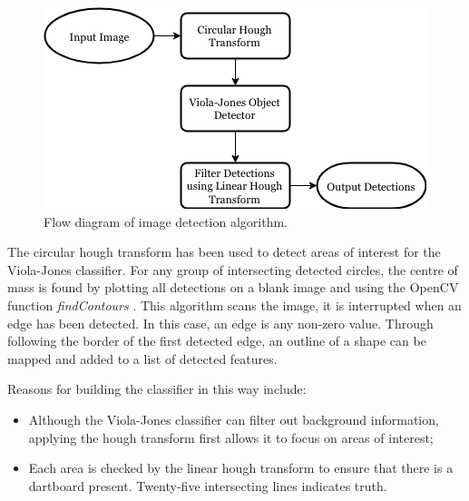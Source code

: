 \documentclass[conference]{IEEEtran}
\begin{document}
\begin{figure}[htbp]
\begin{center}
\includegraphics[width=1\linewidth]{images/flowdiagram.png}
\caption{Flow diagram of image detection algorithm. }
\label{default}
\end{center}
\end{figure}
\par
The circular hough transform has been used to detect areas of interest for the Viola-Jones classifier. For any group of intersecting detected circles, the centre of mass is found by plotting all detections on a blank image and using the OpenCV  function \emph{findContours} \cite{suzuki1985topological}. This algorithm scans the image, it is interrupted when an edge has been detected. In this case, an edge is any non-zero value. Through following the border of the first detected edge, an outline of a shape can be mapped and added to a list of detected features.
\par 
Reasons  for building the classifier in this way include: 
\begin{itemize}
\item Although the Viola-Jones classifier can filter out background information, applying the hough transform first allows it to focus on areas of interest; 
\item Each area is checked by the linear hough transform to ensure that there is a dartboard present. Twenty-five intersecting lines indicates truth. 
\end{itemize}
\end{document}
